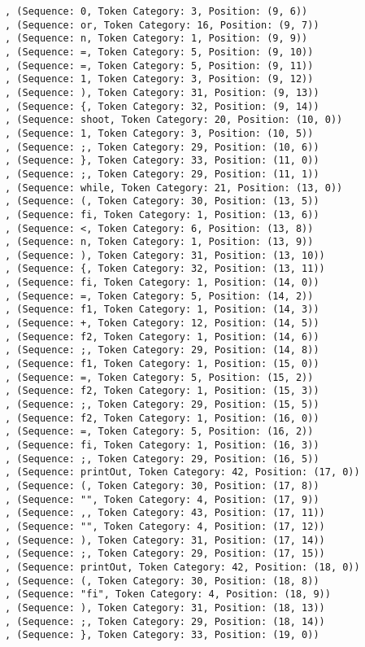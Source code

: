 \documentclass[a4paper, 12pt, article]{memoir}
\begin{document}
\begin{lstlisting}
, (Sequence: 0, Token Category: 3, Position: (9, 6))
, (Sequence: or, Token Category: 16, Position: (9, 7))
, (Sequence: n, Token Category: 1, Position: (9, 9))
, (Sequence: =, Token Category: 5, Position: (9, 10))
, (Sequence: =, Token Category: 5, Position: (9, 11))
, (Sequence: 1, Token Category: 3, Position: (9, 12))
, (Sequence: ), Token Category: 31, Position: (9, 13))
, (Sequence: {, Token Category: 32, Position: (9, 14))
, (Sequence: shoot, Token Category: 20, Position: (10, 0))
, (Sequence: 1, Token Category: 3, Position: (10, 5))
, (Sequence: ;, Token Category: 29, Position: (10, 6))
, (Sequence: }, Token Category: 33, Position: (11, 0))
, (Sequence: ;, Token Category: 29, Position: (11, 1))
, (Sequence: while, Token Category: 21, Position: (13, 0))
, (Sequence: (, Token Category: 30, Position: (13, 5))
, (Sequence: fi, Token Category: 1, Position: (13, 6))
, (Sequence: <, Token Category: 6, Position: (13, 8))
, (Sequence: n, Token Category: 1, Position: (13, 9))
, (Sequence: ), Token Category: 31, Position: (13, 10))
, (Sequence: {, Token Category: 32, Position: (13, 11))
, (Sequence: fi, Token Category: 1, Position: (14, 0))
, (Sequence: =, Token Category: 5, Position: (14, 2))
, (Sequence: f1, Token Category: 1, Position: (14, 3))
, (Sequence: +, Token Category: 12, Position: (14, 5))
, (Sequence: f2, Token Category: 1, Position: (14, 6))
, (Sequence: ;, Token Category: 29, Position: (14, 8))
, (Sequence: f1, Token Category: 1, Position: (15, 0))
, (Sequence: =, Token Category: 5, Position: (15, 2))
, (Sequence: f2, Token Category: 1, Position: (15, 3))
, (Sequence: ;, Token Category: 29, Position: (15, 5))
, (Sequence: f2, Token Category: 1, Position: (16, 0))
, (Sequence: =, Token Category: 5, Position: (16, 2))
, (Sequence: fi, Token Category: 1, Position: (16, 3))
, (Sequence: ;, Token Category: 29, Position: (16, 5))
, (Sequence: printOut, Token Category: 42, Position: (17, 0))
, (Sequence: (, Token Category: 30, Position: (17, 8))
, (Sequence: "", Token Category: 4, Position: (17, 9))
, (Sequence: ,, Token Category: 43, Position: (17, 11))
, (Sequence: "", Token Category: 4, Position: (17, 12))
, (Sequence: ), Token Category: 31, Position: (17, 14))
, (Sequence: ;, Token Category: 29, Position: (17, 15))
, (Sequence: printOut, Token Category: 42, Position: (18, 0))
, (Sequence: (, Token Category: 30, Position: (18, 8))
, (Sequence: "fi", Token Category: 4, Position: (18, 9))
, (Sequence: ), Token Category: 31, Position: (18, 13))
, (Sequence: ;, Token Category: 29, Position: (18, 14))
, (Sequence: }, Token Category: 33, Position: (19, 0))

\end{lstlisting}
\end{document}
